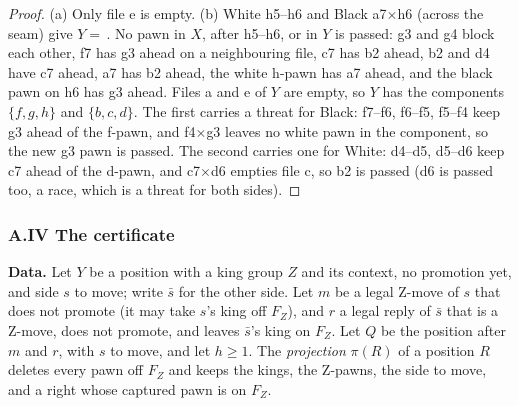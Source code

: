 \begin{proof}
(a) Only file e is empty. (b) White h5--h6 and Black a7$\times$h6 (across the seam) give
$Y=$\,. No pawn in $X$, after h5--h6, or in $Y$ is passed: g3 and g4 block each other, f7
has g3 ahead on a neighbouring file, c7 has b2 ahead, b2 and d4 have c7 ahead, a7 has b2 ahead, the white h-pawn has a7
ahead, and the black pawn on h6 has g3 ahead.
Files a and e of $Y$ are empty, so $Y$ has the components $\{f,g,h\}$ and $\{b,c,d\}$. The first carries a threat for
Black: f7--f6, f6--f5, f5--f4 keep g3 ahead of the f-pawn, and f4$\times$g3 leaves no white pawn in the component, so the new g3 pawn is passed. The second carries
one for White: d4--d5, d5--d6 keep c7 ahead of the d-pawn, and c7$\times$d6 empties file c, so b2 is passed (d6 is passed too, a race, which is a threat for both sides).
\end{proof}

\subsubsection*{A.IV The certificate}

\textbf{Data.} Let $Y$ be a position with a king group $Z$ and its context, no promotion yet, and side $s$ to move; write
$\bar s$ for the other side. Let $m$ be a legal Z-move of $s$ that does not promote (it may take $s$'s king off $F_Z$), and
$r$ a legal reply of $\bar s$ that is a Z-move, does not promote, and leaves $\bar s$'s king on $F_Z$. Let $Q$ be the
position after $m$ and $r$, with $s$ to move, and let $h\ge1$. The \emph{projection} $\pi(R)$ of a position $R$ deletes
every pawn off $F_Z$ and keeps the kings, the Z-pawns, the side to move, and a right whose captured pawn is on $F_Z$.

